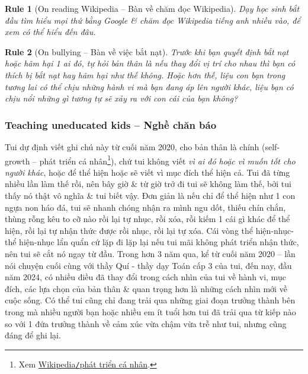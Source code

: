 \documentclass[12pt]{article}
\newtheorem{Rule}{Rule}
\begin{document}
\begin{Rule}[On reading Wikipedia -- Bàn về chăm đọc Wikipedia]
	Dạy học sinh bắt đầu tìm hiểu mọi thứ bằng Google \& chăm đọc Wikipedia tiếng anh nhiều vào, để xem có thể hiểu đến đâu.
\end{Rule}

\begin{Rule}[On bullying -- Bàn về việc bắt nạt]
	Trước khi bạn quyết định bắt nạt hoặc hãm hại 1 ai đó, tự hỏi bản thân là nếu thay đổi vị trí cho nhau thì bạn có thích bị bắt nạt hay hãm hại như thế không. Hoặc hơn thế, liệu con bạn trong tương lai có thể chịu những hành vi mà bạn đang áp lên người khác, liệu bạn có chịu nổi những gì tương tự sẽ xảy ra với con cái của bạn không?
\end{Rule}

\subsubsection{Teaching uneducated kids -- Nghề chăn báo}
Tui dự định viết ghi chú này từ cuối năm 2020, cho bản thân là chính (self-growth -- phát triển cá nhân\footnote{Xem \href{https://vi.wikipedia.org/wiki/Phat_trien_ca_nhan}{Wikipedia{\tt/}phát triển cá nhân}.}), chứ tui không viết {\it vì ai đó hoặc vì muốn tốt cho người khác}, hoặc để thể hiện hoặc sẽ viết vì mục đích thể hiện cả. Tui đã từng nhiều lần làm thế rồi, nên bây giờ \& từ giờ trở đi tui sẽ không làm thế, bởi tui thấy nó thật vô nghĩa \& tui biết vậy. Đơn giản là nếu chỉ để thể hiện như 1 con ngựa non háo đá, tui sẽ nhanh chóng nhận ra mình ngu dốt, thiếu chín chắn, thùng rỗng kêu to cỡ nào rồi lại tự nhục, rồi xóa, rồi kiếm 1 cái gì khác để thể hiện, rồi lại tự nhận thức được rồi nhục, rồi lại tự xóa. Cái vòng thể hiện-nhục-thể hiện-nhục lẩn quẩn cứ lặp đi lặp lại nếu tui mãi không phát triển nhận thức, nên tui sẽ cắt nó ngay từ đầu. Trong hơn 3 năm qua, kể từ cuối năm 2020 -- lần nói chuyện cuối cùng với thầy Quí - thầy dạy Toán cấp 3 của tui, đến nay, đầu năm 2024, có nhiều điều đã thay đổi trong cách nhìn của tui về hành vi, mục đích, các lựa chọn của bản thân \& quan trọng hơn là những cách nhìn mới về cuộc sống. Có thể tui cũng chỉ đang trải qua những giai đoạn trưởng thành bên trong mà nhiều người bạn hoặc nhiều em ít tuổi hơn tui đã trải qua từ kiếp nào so với 1 đứa trưởng thành về cảm xúc vừa chậm vừa trễ như tui, nhưng cũng đáng để ghi lại.
\end{document}

